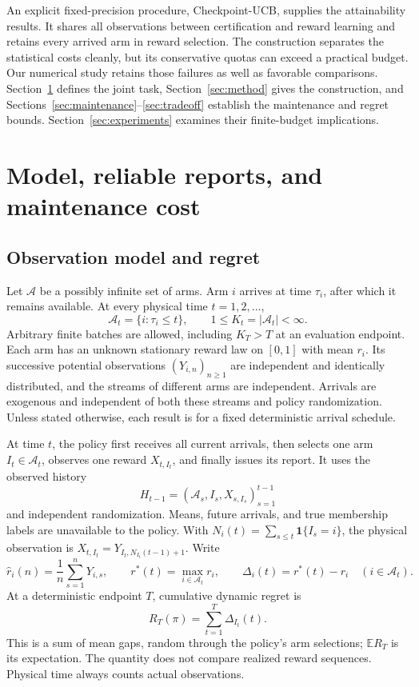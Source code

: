 \documentclass[11pt]{article}
\theoremstyle{remark}
\newcommand{\E}{\mathbb E}
\newcommand{\ind}{\mathbf 1}
\begin{document}
An explicit fixed-precision procedure, Checkpoint-UCB, supplies the
attainability results. It shares all observations between certification
and reward learning and retains every arrived arm in reward selection.
The construction separates the statistical costs cleanly, but its
conservative quotas can exceed a practical budget. Our numerical study
retains those failures as well as favorable comparisons. Section~\ref{sec:model}
defines the joint task, Section~\ref{sec:method} gives the construction,
and Sections~\ref{sec:maintenance}--\ref{sec:tradeoff} establish the
maintenance and regret bounds. Section~\ref{sec:experiments} examines their
finite-budget implications.

\section{Model, reliable reports, and maintenance cost}
\label{sec:model}
\label{sec:problem}

\subsection{Observation model and regret}

Let $\mathcal A$ be a possibly infinite set of arms. Arm $i$ arrives at
time $\tau_i$, after which it remains available. At every physical time
$t=1,2,\ldots$,
\[
 \mathcal A_t=\{i:\tau_i\le t\},\qquad
 1\le K_t=|\mathcal A_t|<\infty.
\]
Arbitrary finite batches are allowed, including $K_T>T$ at an evaluation
endpoint. Each arm has an unknown stationary reward law on $[0,1]$ with
mean $r_i$. Its successive potential observations $(Y_{i,n})_{n\ge1}$ are
independent and identically distributed, and the streams of different arms
are independent. Arrivals are exogenous and independent of both these
streams and policy randomization. Unless stated otherwise, each result
is for a fixed deterministic arrival schedule.

At time $t$, the policy first receives all current arrivals, then selects
one arm $I_t\in\mathcal A_t$, observes one reward $X_{t,I_t}$, and finally
issues its report. It uses the observed history
\[
 H_{t-1}=(\mathcal A_s,I_s,X_{s,I_s})_{s=1}^{t-1}
\]
and independent randomization. Means, future arrivals, and true membership
labels are unavailable to the policy. With
$N_i(t)=\sum_{s\le t}\ind\{I_s=i\}$, the physical observation is
$X_{t,I_t}=Y_{I_t,N_{I_t}(t-1)+1}$. Write
\[
 \hat r_i(n)=\frac1n\sum_{s=1}^nY_{i,s},\qquad
 r^*(t)=\max_{i\in\mathcal A_t}r_i,\qquad
 \Delta_i(t)=r^*(t)-r_i \quad(i\in\mathcal A_t).
\]
At a deterministic endpoint $T$, cumulative dynamic regret is
\[
 R_T(\pi)=\sum_{t=1}^{T}\Delta_{I_t}(t).
\]
This is a sum of mean gaps, random through the policy's arm selections;
$\E R_T$ is its expectation. The quantity does not compare realized
reward sequences. Physical time always counts actual observations.
\end{document}
